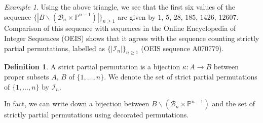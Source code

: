 \documentclass[12pt]{amsart}
\numberwithin{equation}{section}
\theoremstyle{remark}
\newtheorem{exam}[thm]{Example}
\theoremstyle{definition}
\newtheorem{dfn}[thm]{Definition}
\newcommand{\B}{\mathcal{B}}
\begin{document}
\begin{exam}\label{ex:firstsix}
Using the above triangle, we see that the first six values of the sequence $\{|B\backslash(\B_{n}\times \mathbb{P}^{n-1})|\}_{n\geq 1}$ are given by 
$1, \, 5,\, 28, \, 185, \, 1426, \, 12607$.  Comparison of this sequence with sequences in the Online Encyclopedia of Integer Sequences (OEIS) shows that it agrees with the sequence counting strictly partial permutations, labelled as $\{|\mathcal{I}_{n}|\}_{n\geq 1}$ (OEIS sequence A070779).  
\end{exam}

\begin{dfn}
A strict partial permutation is a bijection $\kappa: A\to B$ between proper subsets $A, \, B$ of $\{1,\dots, n\}$.  We denote the set of strict partial permutations of 
$\{1,\dots, n\}$ by $\mathcal{I}_{n}$.
\end{dfn}

 In fact, we can write down a bijection between $B\backslash(\B_{n}\times \mathbb{P}^{n-1})$ and the set 
of strictly partial permutations using decorated permutations.




  

\end{document}
